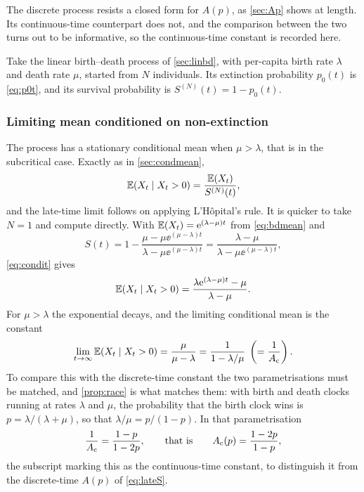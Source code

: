 The discrete process resists a closed form for $A(p)$, as \cref{sec:Ap} shows at
length. Its continuous-time counterpart does not, and the comparison between the
two turns out to be informative, so the continuous-time constant is recorded here.

Take the linear birth--death process of \cref{sec:linbd}, with per-capita birth
rate $\lambda$ and death rate $\mu$, started from $N$ individuals. Its extinction
probability $p_0(t)$ is \cref{eq:p0t}, and its survival probability is
$S^{(N)}(t) = 1-p_0(t)$.

\subsubsection*{Limiting mean conditioned on non-extinction}

The process has a stationary conditional mean when $\mu>\lambda$, that is in the
subcritical case. Exactly as in \cref{sec:condmean},
\begin{equation}
\label{eq:condit}
\mathbb{E}\!\left(X_t\mid X_t>0\right) = \frac{\mathbb{E}\!\left(X_t\right)}{S^{(N)}(t)},
\end{equation}
and the late-time limit follows on applying L'Hôpital's rule. It is quicker to take
$N=1$ and compute directly. With $\mathbb{E}\!\left(X_t\right)=\mathrm{e}^{(\lambda-\mu)t}$ from
\cref{eq:bdmean} and
\begin{equation*}
S(t) = 1-\frac{\mu-\mu\ee^{(\mu-\lambda)t}}{\lambda-\mu\ee^{(\mu-\lambda)t}}
= \frac{\lambda-\mu}{\lambda-\mu\ee^{(\mu-\lambda)t}},
\end{equation*}
\cref{eq:condit} gives
\begin{equation*}
\mathbb{E}\!\left(X_t\mid X_t>0\right) = \frac{\lambda\mathrm{e}^{(\lambda-\mu)t}-\mu}{\lambda-\mu} .
\end{equation*}
For $\mu>\lambda$ the exponential decays, and the limiting conditional mean is the
constant
\begin{equation}
\label{eq:ctsqsmean}
\lim_{t\to\infty}\mathbb{E}\!\left(X_t\mid X_t>0\right) = \frac{\mu}{\mu-\lambda}
= \frac{1}{1-\lambda/\mu}
\;\left(=\frac{1}{A_{\mathrm{c}}}\right) .
\end{equation}
To compare this with the discrete-time constant the two parametrisations must be
matched, and \cref{prop:race} is what matches them: with birth and death clocks
running at rates $\lambda$ and $\mu$, the probability that the birth clock wins is
$p = \lambda/(\lambda+\mu)$, so that $\lambda/\mu = p/(1-p)$. In that
parametrisation
\begin{equation}
\label{eq:Acts}
\frac{1}{A_{\mathrm{c}}} = \frac{1-p}{1-2p},
\qquad\text{that is}\qquad
A_{\mathrm{c}}(p) = \frac{1-2p}{1-p} ,
\end{equation}
the subscript marking this as the continuous-time constant, to distinguish it from
the discrete-time $A(p)$ of \cref{eq:lateS}.

